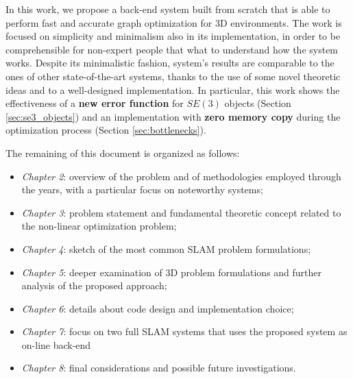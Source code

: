 In this work, we propose a back-end system built from scratch that is able to perform fast and accurate graph optimization for 3D environments. The work is focused on simplicity and minimalism also in its implementation, in order to be comprehensible for non-expert people that what to understand how the system works. Despite its minimalistic fashion, system's results are comparable to the ones of other state-of-the-art systems, thanks to the use of some novel theoretic ideas and to a well-designed implementation. In particular, this work shows the effectiveness of a \textbf{new error function} for $SE(3)$ objects (Section \ref{sec:se3_objects}) and an implementation with \textbf{zero memory copy} during the optimization process (Section \ref{sec:bottlenecks}).

\vspace{20px}

\noindent The remaining of this document is organized as follows:

\begin{itemize}
    \item \textit{Chapter 2}: overview of the problem and of methodologies employed through the years, with a particular focus on noteworthy systems;
    \item \textit{Chapter 3}: problem statement and fundamental theoretic concept related to the non-linear optimization problem;
    \item \textit{Chapter 4}: sketch of the most common SLAM problem formulations;
    \item \textit{Chapter 5}: deeper examination of 3D problem formulations and further analysis of the proposed approach;
    \item \textit{Chapter 6}: details about code design and implementation choice;
    \item \textit{Chapter 7}: focus on two full SLAM systems that uses the proposed system as on-line back-end
    \item \textit{Chapter 8}: final considerations and possible future investigations. 
\end{itemize}